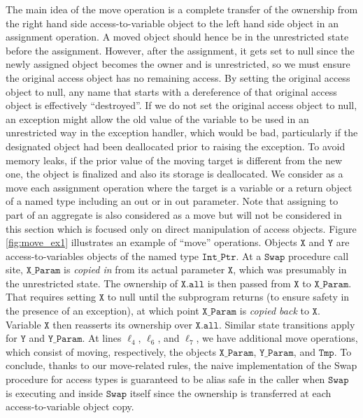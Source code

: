 \documentclass{llncs}
\newcommand\var[1]{\ensuremath{\mathtt{#1}}}
\newcommand{\keyword}[1]{\textsf{#1}}
\begin{document}
The main idea of the move operation is a complete transfer of the ownership from the right hand side access-to-variable object to the left hand side object in an assignment operation.
A moved object should hence be in the unrestricted state before the assignment. However, after the assignment, it gets set to null since the newly assigned object becomes the owner
and is unrestricted, so we must ensure the original access object has no remaining access.  By setting the original access object to null, any name that starts with a dereference of
that original access object is effectively ``destroyed''. If we do not set the original access object to null, an exception might allow the old value of the variable to be used in
an unrestricted way in the exception handler, which would be bad, particularly if the designated object had been deallocated prior to raising the exception. To avoid memory leaks,
if the prior value of the moving target is different from the new one, the object is finalized and also its storage is deallocated.  
We consider as a move each assignment operation where the target is a variable or a return object of a named type including an \keyword{out} or \keyword{in out} parameter.
Note that assigning to part of an aggregate is also considered as a move but will not be considered in this section which is focused only on direct manipulation of access objects.
Figure \ref{fig:move_ex1} illustrates an example of ``move'' operations. Objects \var{X} and \var{Y} are access-to-variables objects of the named type \var{Int\_Ptr}. At a \var{Swap} procedure call site,
\var{X\_Param} is \textit{copied in} from its actual parameter \var{X}, which was presumably in the unrestricted state. The ownership of \var{X.all} is then passed from \var{X} to \var{X\_Param}.
That requires setting \var{X} to null until the subprogram returns (to ensure safety in the presence of an exception), at which point \var{X\_Param} is \textit{copied back} to \var{X}.
Variable \var{X} then reasserts its ownership over \var{X.all}. Similar state transitions apply for \var{Y} and \var{Y\_Param}.  At lines $\ell_4$, $\ell_6$, and $\ell_7$,
we have additional move operations, which consist of moving, respectively, the objects \var{X\_Param}, \var{Y\_Param}, and \var{Tmp}. To conclude, thanks to our move-related rules, the naive
implementation of the Swap procedure for access types is guaranteed to be alias safe in the caller when \var{Swap} is executing and inside \var{Swap} itself since the ownership is transferred
at each access-to-variable object copy. 
\end{document}
